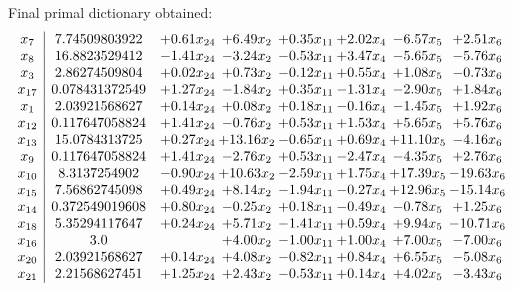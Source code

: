 \documentclass[8pt]{article}
\begin{document}
 Final primal dictionary obtained: 
\[\begin{array}{c| c c@{\hskip 2pt} c@{\hskip 2pt} c@{\hskip 2pt} c@{\hskip 2pt} c@{\hskip 2pt} c@{\hskip 2pt} }
 x_{7}   &  7.74509803922 & +  0.61 x_{24} & +  6.49 x_{2} & +  0.35 x_{11} & +  2.02 x_{4} & -6.57 x_{5} & +  2.51 x_{6}\\
 x_{8}   &  16.8823529412 & -1.41 x_{24} & -3.24 x_{2} & -0.53 x_{11} & +  3.47 x_{4} & -5.65 x_{5} & -5.76 x_{6}\\
 x_{3}   &  2.86274509804 & +  0.02 x_{24} & +  0.73 x_{2} & -0.12 x_{11} & +  0.55 x_{4} & +  1.08 x_{5} & -0.73 x_{6}\\
 x_{17}   &  0.078431372549 & +  1.27 x_{24} & -1.84 x_{2} & +  0.35 x_{11} & -1.31 x_{4} & -2.90 x_{5} & +  1.84 x_{6}\\
 x_{1}   &  2.03921568627 & +  0.14 x_{24} & +  0.08 x_{2} & +  0.18 x_{11} & -0.16 x_{4} & -1.45 x_{5} & +  1.92 x_{6}\\
 x_{12}   &  0.117647058824 & +  1.41 x_{24} & -0.76 x_{2} & +  0.53 x_{11} & +  1.53 x_{4} & +  5.65 x_{5} & +  5.76 x_{6}\\
 x_{13}   &  15.0784313725 & +  0.27 x_{24} & + 13.16 x_{2} & -0.65 x_{11} & +  0.69 x_{4} & + 11.10 x_{5} & -4.16 x_{6}\\
 x_{9}   &  0.117647058824 & +  1.41 x_{24} & -2.76 x_{2} & +  0.53 x_{11} & -2.47 x_{4} & -4.35 x_{5} & +  2.76 x_{6}\\
 x_{10}   &  8.3137254902 & -0.90 x_{24} & + 10.63 x_{2} & -2.59 x_{11} & +  1.75 x_{4} & + 17.39 x_{5} & -19.63 x_{6}\\
 x_{15}   &  7.56862745098 & +  0.49 x_{24} & +  8.14 x_{2} & -1.94 x_{11} & -0.27 x_{4} & + 12.96 x_{5} & -15.14 x_{6}\\
 x_{14}   &  0.372549019608 & +  0.80 x_{24} & -0.25 x_{2} & +  0.18 x_{11} & -0.49 x_{4} & -0.78 x_{5} & +  1.25 x_{6}\\
 x_{18}   &  5.35294117647 & +  0.24 x_{24} & +  5.71 x_{2} & -1.41 x_{11} & +  0.59 x_{4} & +  9.94 x_{5} & -10.71 x_{6}\\
 x_{16}   &  3.0  &   & +  4.00 x_{2} & -1.00 x_{11} & +  1.00 x_{4} & +  7.00 x_{5} & -7.00 x_{6}\\
 x_{20}   &  2.03921568627 & +  0.14 x_{24} & +  4.08 x_{2} & -0.82 x_{11} & +  0.84 x_{4} & +  6.55 x_{5} & -5.08 x_{6}\\
 x_{21}   &  2.21568627451 & +  1.25 x_{24} & +  2.43 x_{2} & -0.53 x_{11} & +  0.14 x_{4} & +  4.02 x_{5} & -3.43 x_{6}\\

\end{array}\]
\end{document}
